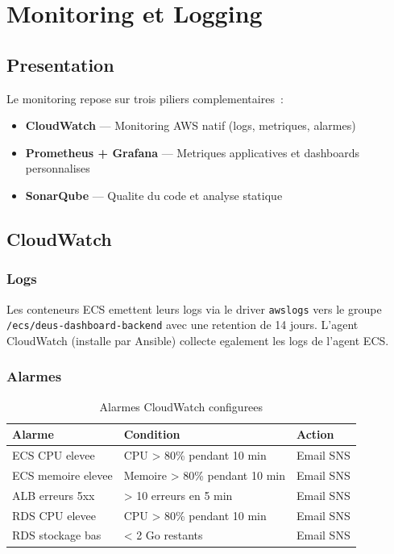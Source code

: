\chapter{Monitoring et Logging}

\section{Presentation}

Le monitoring repose sur trois piliers complementaires~:
\begin{itemize}
    \item \textbf{CloudWatch} --- Monitoring AWS natif (logs, metriques, alarmes)
    \item \textbf{Prometheus + Grafana} --- Metriques applicatives et dashboards personnalises
    \item \textbf{SonarQube} --- Qualite du code et analyse statique
\end{itemize}

\section{CloudWatch}

\subsection{Logs}

Les conteneurs ECS emettent leurs logs via le driver \texttt{awslogs}
vers le groupe \texttt{/ecs/deus-dashboard-backend} avec une retention de 14 jours.
L'agent CloudWatch (installe par Ansible) collecte egalement les logs de l'agent ECS.

\subsection{Alarmes}

\begin{table}[H]
    \centering
    \begin{tabularx}{\textwidth}{lXl}
        \toprule
        \textbf{Alarme} & \textbf{Condition} & \textbf{Action} \\
        \midrule
        ECS CPU elevee & CPU > 80\% pendant 10 min & Email SNS \\
        ECS memoire elevee & Memoire > 80\% pendant 10 min & Email SNS \\
        ALB erreurs 5xx & > 10 erreurs en 5 min & Email SNS \\
        RDS CPU elevee & CPU > 80\% pendant 10 min & Email SNS \\
        RDS stockage bas & < 2 Go restants & Email SNS \\
        \bottomrule
    \end{tabularx}
    \caption{Alarmes CloudWatch configurees}
\end{table}

